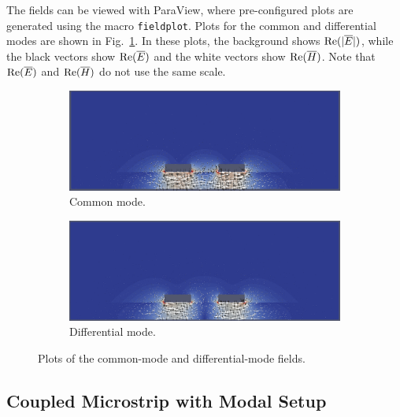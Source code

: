 \documentclass[titlepage]{article}
\renewcommand\_{\textunderscore\linebreak[1]}
\begin{document}
The fields can be viewed with ParaView, where pre-configured plots are generated using the macro \texttt{field\_plot}.  Plots for the common and differential modes are shown in Fig.~\ref{fig:coupled_fields}.  In these plots, the background shows $\textnormal{Re}(|\overline{E}|)$, while the black vectors show $\textnormal{Re}(\overline{E})$ and the white vectors show $\textnormal{Re}(\overline{H})$. Note that $\textnormal{Re}(\overline{E})$ and $\textnormal{Re}(\overline{H})$ do not use the same scale.

\begin{figure}[H]
  \centering
  \begin{subfigure}{0.75\textwidth}
     \includegraphics[width=\linewidth]{../tutorials/OpenParEM2D/coupled_microstrip/screenshots/coupled_common_mode}
     \caption{Common mode.}
  \end{subfigure}
  \par\bigskip
  \begin{subfigure}{0.75\textwidth}
     \includegraphics[width=\linewidth]{../tutorials/OpenParEM2D/coupled_microstrip/screenshots/coupled_differential_mode}
     \caption{Differential mode.}
  \end{subfigure}
  \caption{Plots of the common-mode and differential-mode fields.}
  \label{fig:coupled_fields}
\end{figure}

\subsection{Coupled Microstrip with Modal Setup}
\end{document}

